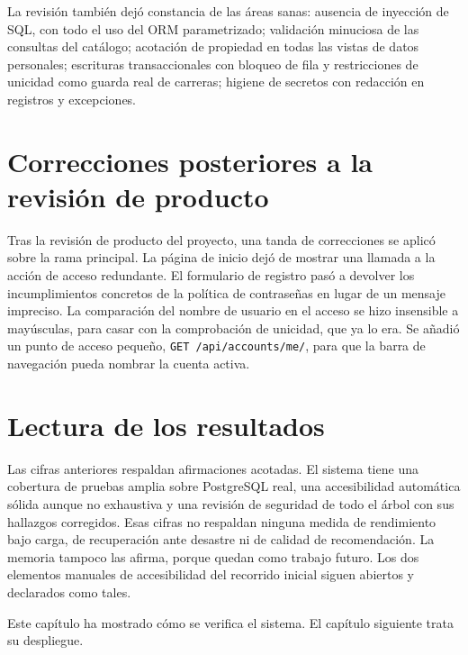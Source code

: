 La revisión también dejó constancia de las áreas sanas: ausencia de inyección de SQL, con
todo el uso del ORM parametrizado; validación minuciosa de las consultas del catálogo;
acotación de propiedad en todas las vistas de datos personales; escrituras transaccionales
con bloqueo de fila y restricciones de unicidad como guarda real de carreras; higiene de
secretos con redacción en registros y excepciones.

\section{Correcciones posteriores a la revisión de producto}\label{sec:pru-post-cierre}

Tras la revisión de producto del proyecto, una tanda de correcciones se aplicó sobre la rama
principal. La página de inicio dejó de
mostrar una llamada a la acción de acceso redundante. El formulario de registro pasó a
devolver los incumplimientos concretos de la política de contraseñas en lugar de un mensaje
impreciso. La comparación del nombre de usuario en el acceso se hizo insensible a mayúsculas,
para casar con la comprobación de unicidad, que ya lo era. Se añadió un punto de acceso
pequeño, \texttt{GET /api/accounts/me/}, para que la barra de navegación pueda nombrar la
cuenta activa.

\section{Lectura de los resultados}\label{sec:pru-lectura}

Las cifras anteriores respaldan afirmaciones acotadas. El sistema tiene una cobertura de
pruebas amplia sobre PostgreSQL real, una accesibilidad automática sólida aunque no
exhaustiva y una revisión de seguridad de todo el árbol con sus hallazgos corregidos. Esas
cifras no respaldan ninguna medida de rendimiento bajo carga, de recuperación ante desastre
ni de calidad de recomendación. La memoria tampoco las afirma, porque quedan como trabajo
futuro. Los dos elementos manuales de accesibilidad del recorrido inicial siguen abiertos y
declarados como tales.

Este capítulo ha mostrado cómo se verifica el sistema. El capítulo siguiente trata su
despliegue.
